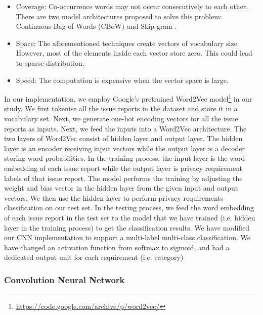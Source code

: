 \begin{itemize}
	\item Coverage: Co-occurrence words may not occur consecutively to each other. There are two model architectures proposed to solve this problem: Continuous Bag-of-Words (CBoW) \cite{Harris1954} and Skip-gram \cite{Mikolov2013}.
	\item Space: The aforementioned techniques create vectors of vocabulary size. However, most of the elements inside each vector store zero. This could lead to sparse distribution.
	\item Speed: The computation is expensive when the vector space is large.
\end{itemize}

In our implementation, we employ Google's pretrained Word2Vec model\footnote{\url{https://code.google.com/archive/p/word2vec/}} in our study. We first tokenise all the issue reports in the dataset and store it in a vocabulary set. Next, we generate one-hot encoding vectors for all the issue reports as inputs. Next, we feed the inputs into a Word2Vec architecture. The two layers of Word2Vec consist of hidden layer and output layer. The hidden layer is an encoder receiving input vectors while the output layer is a decoder storing word probabilities. In the training process, the input layer is the word embedding of each issue report while the output layer is privacy requirement labels of that issue report. The model performs the training by adjusting the weight and bias vector in the hidden layer from the given input and output vectors. We then use the hidden layer to perform privacy requirements classification on our test set. In the testing process, we feed the word embedding of each issue report in the test set to the model that we have trained (i.e. hidden layer in the training process) to get the classification results. %
 We have modified our CNN implementation to support a multi-label multi-class classification. We have changed an activation function from softmax to sigmoid, and had a dedicated output unit for each requirement (i.e. category)

\subsubsection{Convolution Neural Network} \label{subsec:CNN}

